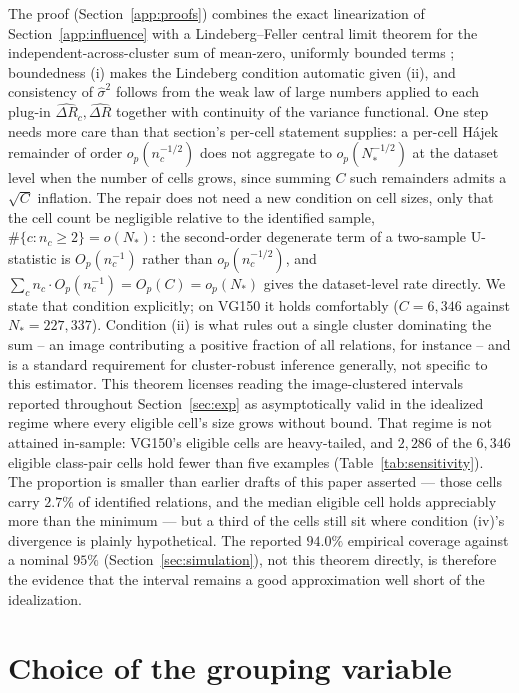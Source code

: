 The proof (Section~\ref{app:proofs}) combines the exact linearization of
Section~\ref{app:influence} with a Lindeberg--Feller central limit theorem for the
independent-across-cluster sum of mean-zero, uniformly bounded terms
\citep{serfling1980approximation,vandervaart1998asymptotic}; boundedness (i) makes the
Lindeberg condition automatic given (ii), and consistency of $\widehat\sigma^2$ follows
from the weak law of large numbers applied to each plug-in $\widehat{\Delta R}_c,
\widehat{\Delta R}$ together with continuity of the variance functional. One step needs
more care than that section's per-cell statement supplies: a per-cell H\'ajek remainder of
order $o_p(n_c^{-1/2})$ does not aggregate to $o_p(N_*^{-1/2})$ at the dataset level when
the number of cells grows, since summing $C$ such remainders admits a $\sqrt C$ inflation.
The repair does not need a new condition on cell sizes, only that the cell count be
negligible relative to the identified sample, $\#\{c:n_c\ge2\}=o(N_*)$: the second-order
degenerate term of a two-sample U-statistic is $O_p(n_c^{-1})$ rather than
$o_p(n_c^{-1/2})$, and $\sum_c n_c\cdot O_p(n_c^{-1})=O_p(C)=o_p(N_*)$ gives the
dataset-level rate directly. We state that condition explicitly; on VG150 it holds
comfortably ($C=6{,}346$ against $N_*=227{,}337$). Condition (ii) is what rules out a single cluster dominating the
sum -- an image contributing a positive fraction of all relations, for instance -- and
is a standard requirement for cluster-robust inference generally, not specific to this
estimator. This theorem licenses reading the image-clustered intervals reported
throughout Section~\ref{sec:exp} as asymptotically valid in the idealized regime where
every eligible cell's size grows without bound. That regime is not attained in-sample:
VG150's eligible cells are heavy-tailed, and $2{,}286$ of the $6{,}346$ eligible
class-pair cells hold fewer than five examples (Table~\ref{tab:sensitivity}). The
proportion is smaller than earlier drafts of this paper asserted --- those cells carry
$2.7\%$ of identified relations, and the median eligible cell holds appreciably more than
the minimum --- but a third of the cells still sit where condition (iv)'s divergence is
plainly hypothetical. The reported $94.0\%$ empirical coverage against a nominal $95\%$
(Section~\ref{sec:simulation}), not this theorem directly, is therefore the evidence that
the interval remains a good approximation well short of the idealization.

\section{Choice of the grouping variable}\label{app:partition}

